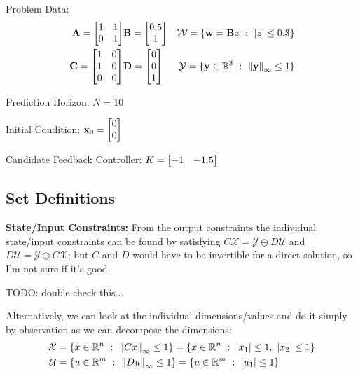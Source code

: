\documentclass[]{article}
\newcommand{\R}{\mathbb{R}}
\newcommand{\st}{\ : \ }
\begin{document}
\newpage
\section{}
Problem Data:
\begin{equation}
    \begin{aligned}
        \mathbf{A} = \mqty[1&1\\0&1] & \mathbf{B} = \mqty[0.5\\1] & \mathcal{W} = \{\vb{w} = \mathbf{B} z \st \abs{z} \leq 0.3\}\\
        \mathbf{C} = \mqty[1&0\\1&0\\0&0] & \mathbf{D} = \mqty[0\\0\\1] & \mathcal{Y} = \{\vb{y} \in \R^3 \st \norm{\vb{y}}_{\infty} \leq 1\}
    \end{aligned}
\end{equation}

Prediction Horizon:
$N = 10$

Initial Condition:
$\vb{x}_0 = \mqty[0\\0]$

Candidate Feedback Controller:
$K = \mqty[-1 & -1.5]$

\subsection{Set Definitions}
\textbf{State/Input Constraints:}
From the output constraints the individual state/input constraints can be found by satisfying
$C \mathcal{X} = \mathcal{Y} \ominus D \mathcal{U}$
and 
$D \mathcal{U} = \mathcal{Y} \ominus C \mathcal{X}$;
but $C$ and $D$ would have to be invertible for a direct solution, so I'm not sure if it's good.

TODO: double check this...

Alternatively, we can look at the individual dimensions/values and do it simply by observation as we can decompose the dimensions:
\begin{equation}
    \begin{aligned}
        \mathcal{X} &= \{x \in \R^n \st \norm{C x}_\infty \leq 1\} 
            = \{x \in \R^n \st \abs{x_1} \leq 1, \ \abs{x_2} \leq 1\}\\
        \mathcal{U} &= \{u \in \R^m \st \norm{D u}_\infty \leq 1\}
            = \{u \in \R^m \st \abs{u_1} \leq 1\}
    \end{aligned}
\end{equation}
\end{document}
